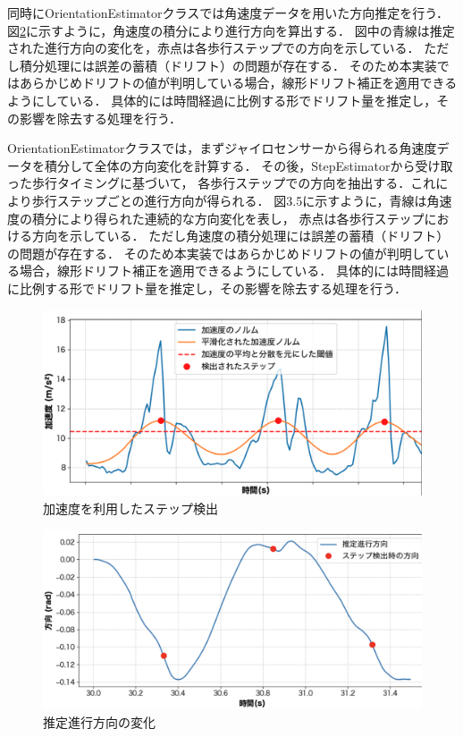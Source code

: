 同時にOrientationEstimatorクラスでは角速度データを用いた方向推定を行う．
図\ref{fig:step_timing}に示すように，角速度の積分により進行方向を算出する．
図中の青線は推定された進行方向の変化を，赤点は各歩行ステップでの方向を示している．
ただし積分処理には誤差の蓄積（ドリフト）の問題が存在する．
そのため本実装ではあらかじめドリフトの値が判明している場合，線形ドリフト補正を適用できるようにしている．
具体的には時間経過に比例する形でドリフト量を推定し，その影響を除去する処理を行う．

OrientationEstimatorクラスでは，まずジャイロセンサーから得られる角速度データを積分して全体の方向変化を計算する．
その後，StepEstimatorから受け取った歩行タイミングに基づいて，
各歩行ステップでの方向を抽出する．これにより歩行ステップごとの進行方向が得られる．
図3.5に示すように，青線は角速度の積分により得られた連続的な方向変化を表し，
赤点は各歩行ステップにおける方向を示している．
ただし角速度の積分処理には誤差の蓄積（ドリフト）の問題が存在する．
そのため本実装ではあらかじめドリフトの値が判明している場合，線形ドリフト補正を適用できるようにしている．
具体的には時間経過に比例する形でドリフト量を推定し，その影響を除去する処理を行う．

\begin{figure}[H]
	\centering
	\includegraphics[width=\linewidth]{../image/step_detect.jpg}
	\caption{加速度を利用したステップ検出}    \label{fig:step_detect}
\end{figure}

\begin{figure}[H]
	\centering
	\includegraphics[width=\linewidth]{../image/step_timing_angle.jpg}
	\caption{推定進行方向の変化}    \label{fig:step_timing}
\end{figure}


